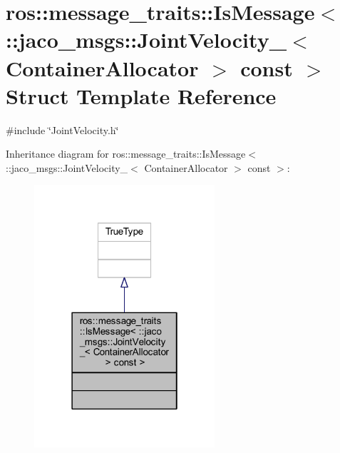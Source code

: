 \hypertarget{structros_1_1message__traits_1_1IsMessage_3_01_1_1jaco__msgs_1_1JointVelocity___3_01ContainerAllocator_01_4_01const_01_01_4}{}\section{ros\+:\+:message\+\_\+traits\+:\+:Is\+Message$<$ \+:\+:jaco\+\_\+msgs\+:\+:Joint\+Velocity\+\_\+$<$ Container\+Allocator $>$ const $>$ Struct Template Reference}
\label{structros_1_1message__traits_1_1IsMessage_3_01_1_1jaco__msgs_1_1JointVelocity___3_01ContainerAllocator_01_4_01const_01_01_4}


{\ttfamily \#include \char`\"{}Joint\+Velocity.\+h\char`\"{}}



Inheritance diagram for ros\+:\+:message\+\_\+traits\+:\+:Is\+Message$<$ \+:\+:jaco\+\_\+msgs\+:\+:Joint\+Velocity\+\_\+$<$ Container\+Allocator $>$ const $>$\+:
\nopagebreak
\begin{figure}[H]
\begin{center}
\leavevmode
\includegraphics[width=190pt]{d1/d68/structros_1_1message__traits_1_1IsMessage_3_01_1_1jaco__msgs_1_1JointVelocity___3_01ContainerAll247d680d2dc00a7076b1ab54ebf77778}
\end{center}
\end{figure}



